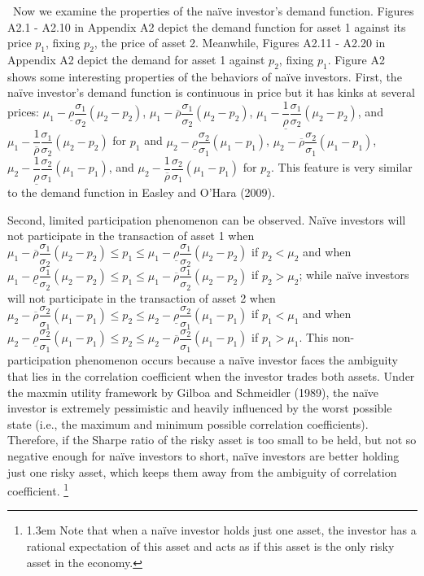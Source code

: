 \documentclass[10pt]{article}
\begin{document}
\quad \ 
Now we examine the properties of the na\"ive investor's demand function. Figures A2.1 - A2.10 in Appendix A2 depict the demand function for asset 1 against its price $ p_1 $, fixing $ p_2 $, the price of asset 2. Meanwhile, Figures A2.11 - A2.20 in Appendix A2 depict the demand for asset 1 against $ p_2 $, fixing $ p_1 $. Figure A2 shows some interesting properties of the behaviors of na\"ive investors. First, the na\"ive investor's demand function is continuous in price but it has kinks at several prices: $ \mu_1 - \underline{\rho} \dfrac{\sigma_1}{\sigma_2} (\mu_2 - p_2) $, $ \mu_1 - \overline{\rho} \dfrac{\sigma_1}{\sigma_2} (\mu_2 - p_2) $, $ \mu_1 - \dfrac1{\underline{\rho}} \dfrac{\sigma_1}{\sigma_2} (\mu_2 - p_2) $, and $ \mu_1 - \dfrac1{\overline{\rho}} \dfrac{\sigma_1}{\sigma_2} (\mu_2 - p_2) $ for $ p_1 $ and $ \mu_2 - \underline{\rho} \dfrac{\sigma_2}{\sigma_1} (\mu_1 - p_1) $, $ \mu_2 - \overline{\rho} \dfrac{\sigma_2}{\sigma_1} (\mu_1 - p_1) $, $ \mu_2 - \dfrac1{\underline{\rho}} \dfrac{\sigma_2}{\sigma_1} (\mu_1 - p_1) $, and $ \mu_2 - \dfrac1{\overline{\rho}} \dfrac{\sigma_2}{\sigma_1} (\mu_1 - p_1) $ for $ p_2 $. This feature is very similar to the demand function in Easley and O'Hara (2009).

Second, limited participation phenomenon can be observed. Na\"ive investors will not participate in the transaction of asset 1 when $ \mu_1 - \overline{\rho} \dfrac{\sigma_1}{\sigma_2} (\mu_2 - p_2) \leqslant p_1 \leqslant \mu_1 - \underline{\rho} \dfrac{\sigma_1}{\sigma_2} (\mu_2 - p_2) $ if $ p_2 < \mu_2 $ and when $ \mu_1 - \underline{\rho} \dfrac{\sigma_1}{\sigma_2} (\mu_2 - p_2) \leqslant p_1 \leqslant \mu_1 - \overline{\rho} \dfrac{\sigma_1}{\sigma_2} (\mu_2 - p_2) $ if $ p_2 > \mu_2 $; while na\"ive investors will not participate in the transaction of asset 2 when $ \mu_2 - \overline{\rho} \dfrac{\sigma_2}{\sigma_1} (\mu_1 - p_1) \leqslant p_2 \leqslant \mu_2 - \underline{\rho} \dfrac{\sigma_2}{\sigma_1} (\mu_1 - p_1) $ if $ p_1 < \mu_1 $ and when $ \mu_2 - \underline{\rho} \dfrac{\sigma_2}{\sigma_1} (\mu_1 - p_1) \leqslant p_2 \leqslant \mu_2 - \overline{\rho} \dfrac{\sigma_2}{\sigma_1} (\mu_1 - p_1) $ if $ p_1 > \mu_1 $. This non-participation phenomenon occurs because a na\"ive investor faces the ambiguity that lies in the correlation coefficient when the investor trades both assets. Under the maxmin utility framework by Gilboa and Schmeidler (1989), the na\"ive investor is extremely pessimistic and heavily influenced by the worst possible state (i.e., the maximum and minimum possible correlation coefficients). Therefore, if the Sharpe ratio of the risky asset is too small to be held, but not so negative enough for na\"ive investors to short, na\"ive investors are better holding just one risky asset, which keeps them away from the ambiguity of correlation coefficient. \footnote{\baselineskip1.3em Note that when a na\"ive investor holds just one asset, the investor has a rational expectation of this asset and acts as if this asset is the only risky asset in the economy.}
\end{document}
